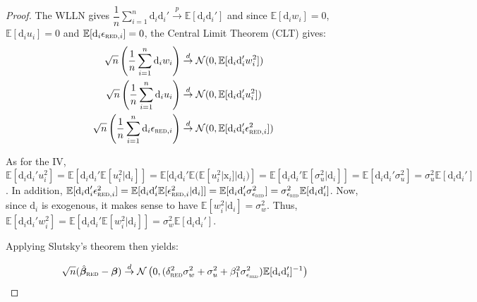 \documentclass[a4paper, 11pt]{report}
\begin{document}
\begin{proof}
			The WLLN gives $\dfrac{1}{n} \sum_{i = 1}^{n} \text{d}_{i} \text{d}_{i}'  \overset{p}{\to}  \mathbb{E}[\text{d}_{i}\text{d}_{i}']$ and since $\mathbb{E}[\text{d}_{i}w_{i}] = 0$,$\mathbb{E}[\text{d}_{i}u_{i}] = 0$ and $\mathbb{E}[\text{d}_{i}\epsilon_{\textsc{red}, i}] = 0$, the Central Limit Theorem (CLT) gives:
			~
			\begin{align*}
				\sqrt{n} \left(\dfrac{1}{n} \sum_{i = 1}^{n} \text{d}_{i} w_{i} \right)
					& \overset{d}{\to} \mathcal{N}(0, \mathbb{E}[\text{d}_{i}\text{d}_{i}'w_{i}^{2}])\\
				\sqrt{n} \left(\dfrac{1}{n} \sum_{i = 1}^{n} \text{d}_{i} u_{i} \right) 
					& \overset{d}{\to} \mathcal{N}(0, \mathbb{E}[\text{d}_{i}\text{d}_{i}'u_{i}^{2}])\\
				\sqrt{n} \left(\dfrac{1}{n} \sum_{i = 1}^{n} \text{d}_{i} \epsilon_{\textsc{red}, i} \right)
					& \overset{d}{\to} \mathcal{N}(0, \mathbb{E}[\text{d}_{i}\text{d}_{i}'\epsilon_{\textsc{red}, i}^{2}])
			\end{align*}
			
			As for the IV, $\mathbb{E}[\text{d}_{i}\text{d}_{i}'u_{i}^{2}]  = 
				\mathbb{E}[\text{d}_{i}\text{d}_{i}'\mathbb{E}[u_{i}^{2} | \text{d}_{i}]] = 
				\mathbb{E}[\text{d}_{i}\text{d}_{i}'\mathbb{E}(\mathbb{E}[u_{i}^{2} | \text{x}_{i}] | \text{d}_{i})] = 
				\mathbb{E}[\text{d}_{i}\text{d}_{i}'\mathbb{E}[\sigma_{u}^{2} | \text{d}_{i}]] = 
				\mathbb{E}[\text{d}_{i}\text{d}_{i}'\sigma_{u}^{2}] = 
				\sigma_{u}^{2}\mathbb{E}[\text{d}_{i}\text{d}_{i}']$.
			In addition, $\mathbb{E}[\text{d}_{i}\text{d}_{i}'\epsilon_{\textsc{red}, i}^{2}]  = 
				\mathbb{E}[\text{d}_{i}\text{d}_{i}'\mathbb{E}[\epsilon_{\textsc{red}, i}^{2} | \text{d}_{i}]] = 
				\mathbb{E}[\text{d}_{i}\text{d}_{i}'\sigma_{\epsilon_{\textsc{red}}}^{2}] = 
				\sigma_{\epsilon_{\textsc{red}}}^{2} \mathbb{E}[\text{d}_{i}\text{d}_{i}']$.
			Now, since $\text{d}_{i}$ is exogenous, it makes sense to have $\mathbb{E}[w_{i}^{2} | \text{d}_{i}] = \sigma_{w}^{2}$. Thus, $\mathbb{E}[\text{d}_{i}\text{d}_{i}'w_{i}^{2}]  = 
				\mathbb{E}[\text{d}_{i}\text{d}_{i}'\mathbb{E}[w_{i}^{2} | \text{d}_{i}]] = 
				\sigma_{w}^{2}\mathbb{E}[\text{d}_{i}\text{d}_{i}']$.
				
			Applying Slutsky's theorem then yields:
				
				\[ \sqrt{n}(\hat{\bm{\beta}}_{\textsc{red}} - \bm{\beta}) \overset{d}{\to} 
					\mathcal{N}\left(0,  (\delta_{\textsc{red}}^{2}\sigma_{w}^{2} + \sigma_{u}^{2} + \beta_{1}^{2}\sigma_{\epsilon_{\textsc{red}}}^{2}) \mathbb{E}[\text{d}_{i}\text{d}_{i}']^{-1} \right) \]
			

\end{proof}
\end{document}
